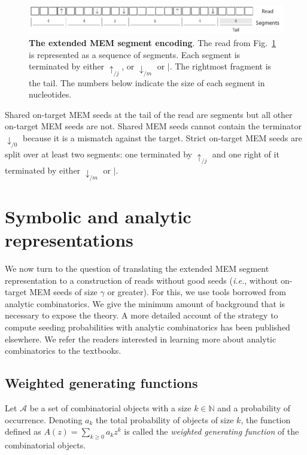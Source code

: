 \documentclass{article}
\begin{document}
\begin{figure}[h]
\centering
\includegraphics[scale=.85]{sketch_segments.pdf}
\caption{\textbf{The extended MEM segment encoding}.
The read from Fig.~\ref{fig:sketch_segment} is represented as a sequence
of segments. Each segment is terminated by either $\uparrow_{/j}$, or
$\downarrow_{/m}$ or $|$. The rightmost fragment is the tail. The numbers
below indicate the size of each segment in nucleotides.}
\label{fig:sketch_segment}
\end{figure}

Shared on-target MEM seeds at the tail of the read are segments but all
other on-target MEM seeds are not. Shared MEM seeds cannot contain the
terminator $\downarrow_{/0}$ because it is a mismatch against the target.
Strict on-target MEM seeds are split over at least two segments: one
terminated by $\uparrow_{/j}$ and one right of it terminated by either
$\downarrow_{/m}$ or $|$.


\section{Symbolic and analytic representations}

We now turn to the question of translating the extended MEM segment
representation to a construction of reads without good seeds
(\textit{i.e.}, without on-target MEM seeds of size $\gamma$ or greater).
For this, we use tools borrowed from analytic combinatorics. We give the
minimum amount of background that is necessary to expose the theory. A
more detailed account of the strategy to compute seeding probabilities
with analytic combinatorics has been published
elsewhere\cite{filion2017analytic,filion2018analytic}. We refer the
readers interested in learning more about analytic combinatorics to the
textbooks\cite{flajolet2009analytic,sedgewick2013introduction}.

\subsection{Weighted generating functions}

Let $\mathcal{A}$ be a set of combinatorial objects with a size $k \in
\mathbb{N}$ and a probability of occurrence. Denoting $a_k$ the total
probability of objects of size $k$, the function defined as $A(z) =
\sum_{k\geq0} a_kz^k$ is called the \emph{weighted generating
function} of the combinatorial objects.
\end{document}
